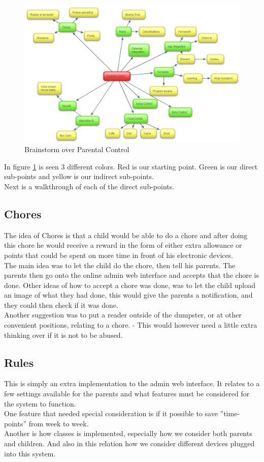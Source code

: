 \begin{figure}[htbp]
	\centering
		\includegraphics[width=1.50\textwidth]{images/BrainStorm.png}
	\caption{Brainstorm over Parental Control}
	\label{fig:BrainStorm}
\end{figure}

In figure \ref{fig:BrainStorm} is seen 3 different colors. Red is our starting point. Green is our direct sub-points and yellow is our indirect sub-points.\\
Next is a walkthrough of each of the direct sub-points.\\
\subsection{Chores}
The idea of Chores is that a child would be able to do a chore and after doing this chore he would receive a reward in the form of either extra allowance or points that could be spent on more time in front of his electronic devices.\\
The main idea was to let the child do the chore, then tell his parents. The parents then go onto the online admin web interface and accepts that the chore is done. Other ideas of how to accept a chore was done, was to let the child upload an image of what they had done, this would give the parents a notification, and they could then check if it was done.\\
Another suggestion was to put a reader outside of the dumpster, or at other convenient positions, relating to a chore. - This would however need a little extra thinking over if it is not to be abused.

\subsection{Rules}
This is simply an extra implementation to the admin web interface. It relates to a few settings available for the parents and what features must be considered for the system to function.\\
One feature that needed special consideration is if it possible to save ''time-points'' from week to week.\\
Another is how classes is implemented, especially how we consider both parents and children. And also in this relation how we consider different devices plugged into this system.

